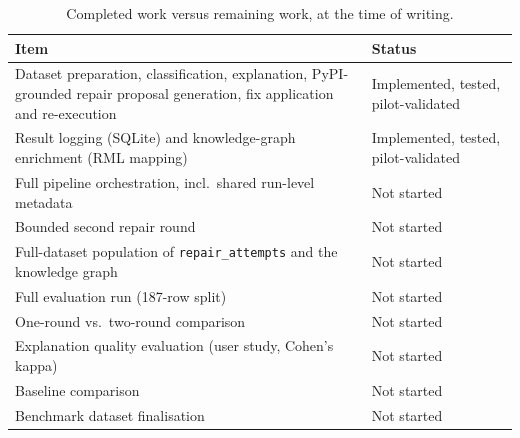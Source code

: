 \begin{table}[h]
  \centering
  \begin{tabular}{|p{7.2cm}|l|}
    \hline
    \textbf{Item} & \textbf{Status} \\
    \hline
    Dataset preparation, classification, explanation, PyPI-grounded repair
      proposal generation, fix application and re-execution &
      Implemented, tested, pilot-validated \\
    \hline
    Result logging (SQLite) and knowledge-graph enrichment (RML mapping) &
      Implemented, tested, pilot-validated \\
    \hline
    Full pipeline orchestration, incl.\ shared run-level metadata & Not started \\
    \hline
    Bounded second repair round & Not started \\
    \hline
    Full-dataset population of \texttt{repair\_attempts} and the knowledge graph &
      Not started \\
    \hline
    Full evaluation run (187-row split) & Not started \\
    \hline
    One-round vs.\ two-round comparison & Not started \\
    \hline
    Explanation quality evaluation (user study, Cohen's kappa) & Not started \\
    \hline
    Baseline comparison & Not started \\
    \hline
    Benchmark dataset finalisation & Not started \\
    \hline
  \end{tabular}
  \caption{Completed work versus remaining work, at the time of writing.}
  \label{tab:future-summary}
\end{table}
